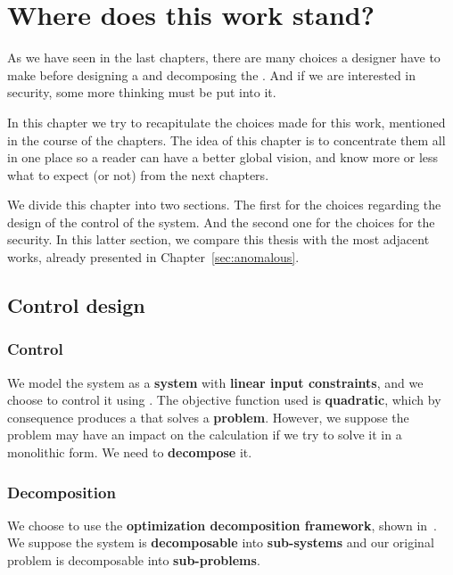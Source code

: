 \documentclass[../main.tex]{subfiles}
\begin{document}
\chapter*{Where does this work stand?}\label{sec:positioning}
As we have seen in the last chapters, there are many choices a designer have to make before designing a \cps{} and decomposing the \mpc{}.
And if we are interested in security, some more thinking must be put into it.

In this chapter we try to recapitulate the choices made for this work, mentioned in the course of the chapters.
The idea of this chapter is to concentrate them all in one place so a reader can have a better global vision, and know more or less what to expect (or not) from the next chapters.

We divide this chapter into two sections.
The first for the choices regarding the design of the control of the system.
And the second one for the choices for the security.
In this latter section, we compare this thesis with the most adjacent works, already presented in Chapter~\ref{sec:anomalous}.

\section*{Control design}
\subsection*{Control}\label{sec:control_chosen}
We model the system as a \textbf{\ltidt{} system} with \textbf{linear input constraints}, and we choose to control it using \textbf{\mpc{}}.
The objective function used is \textbf{quadratic}, which by consequence produces a \mpc{} that solves a \textbf{\qp{} problem}.
However, we suppose the problem may have an impact on the calculation if we try to solve it in a monolithic form. We need to \textbf{decompose} it.

\subsection*{Decomposition}\label{sec:decomposition_chosen}
We choose to use the \textbf{optimization decomposition framework}, shown in~\cite{ConejoEtAl2006,BoydEtAl2015}.
We suppose the system is \textbf{decomposable} into \textbf{sub-systems} and our original problem is decomposable into \textbf{sub-problems}.
\end{document}
